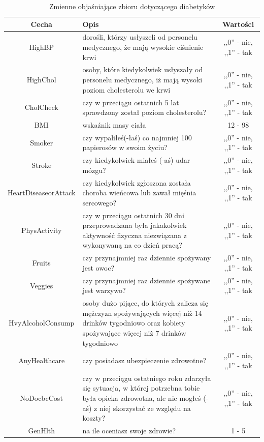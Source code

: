 \begin{xltabular}{\textwidth}{| c | >{\centering\arraybackslash}X | c |}
\caption{Zmienne objaśniające zbioru dotyczącego diabetyków}
\label{tab:explanatory_var_diabetes}\\
\hline
Cecha & Opis & Wartości \\ \hline
\endfirsthead

HighBP & dorośli, którzy usłyszeli od personelu medycznego, że mają wysokie ciśnienie krwi & ,,0'' - nie, ,,1'' - tak \\ \hline
HighChol & osoby, które kiedykolwiek usłyszały od personelu medycznego, iż mają wysoki poziom cholesterolu we krwi & ,,0'' - nie, ,,1'' - tak \\ \hline
CholCheck & czy w przeciągu ostatnich 5 lat sprawdzony został poziom cholesterolu? & ,,0'' - nie, ,,1'' - tak \\ \hline
BMI & wskaźnik masy ciała & 12 - 98 \\ \hline
Smoker & czy wypaliłeś(-łaś) co najmniej 100 papierosów w swoim życiu? & ,,0'' - nie, ,,1'' - tak \\ \hline
Stroke & czy kiedykolwiek miałeś (-aś) udar mózgu? & ,,0'' - nie, ,,1'' - tak \\ \hline
HeartDiseaseorAttack & czy kiedykolwiek zgłoszona została choroba wieńcowa lub zawał mięśnia sercowego? & ,,0'' - nie, ,,1'' - tak \\ \hline
PhysActivity & czy w przeciągu ostatnich 30 dni przeprowadzana była jakakolwiek aktywność fizyczna niezwiązana z wykonywaną na co dzień pracą? & ,,0'' - nie, ,,1'' - tak \\ \hline
Fruits & czy przynajmniej raz dziennie spożywany jest owoc? & ,,0'' - nie, ,,1'' - tak \\ \hline
Veggies & czy przynajmniej raz dziennie spożywane jest warzywo? & ,,0'' - nie, ,,1'' - tak \\ \hline
HvyAlcoholConsump & osoby dużo pijące, do których zalicza się mężczyzn spożywających więcej niż 14 drinków tygodniowo oraz kobiety spożywające więcej niż 7 drinków tygodniowo & ,,0'' - nie, ,,1'' - tak \\ \hline
AnyHealthcare & czy posiadasz ubezpieczenie zdrowotne? & ,,0'' - nie, ,,1'' - tak \\ \hline
NoDocbcCost & czy w przeciągu ostatniego roku zdarzyła się sytuacja, w której potrzebna tobie była opieka zdrowotna, ale nie mogłeś (-aś) z niej skorzystać ze względu na koszty? & ,,0'' - nie, ,,1'' - tak \\ \hline
GenHlth & na ile oceniasz swoje zdrowie? & 1 - 5 \\ \hline

\end{xltabular}
